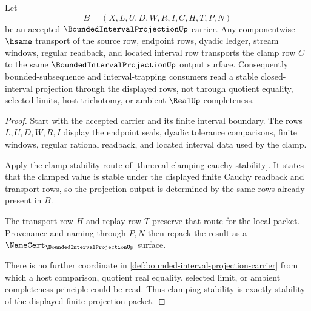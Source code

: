 \begin{theorem}
\label{thm:bounded-interval-projection-clamping-stability}
Let
$$
B=(X,L,U,D,W,R,I,C,H,T,P,N)
$$
be an accepted $\BoundedIntervalProjectionUp$ carrier. Any componentwise $\hsame$ transport of the source row, endpoint rows, dyadic ledger, stream windows, regular readback, and located interval row transports the clamp row $C$ to the same $\BoundedIntervalProjectionUp$ output surface. Consequently bounded-subsequence and interval-trapping consumers read a stable closed-interval projection through the displayed rows, not through quotient equality, selected limits, host trichotomy, or ambient $\RealUp$ completeness.
\end{theorem}
\begin{proof}
Start with the accepted carrier and its finite interval boundary. The rows $L,U,D,W,R,I$ display the endpoint seals, dyadic tolerance comparisons, finite windows, regular rational readback, and located interval data used by the clamp.

Apply the clamp stability route of \autoref{thm:real-clamping-cauchy-stability}. It states that the clamped value is stable under the displayed finite Cauchy readback and transport rows, so the projection output is determined by the same rows already present in $B$.

The transport row $H$ and replay row $T$ preserve that route for the local packet. Provenance and naming through $P,N$ then repack the result as a $\NameCert_{\BoundedIntervalProjectionUp}$ surface.

There is no further coordinate in \autoref{def:bounded-interval-projection-carrier} from which a host comparison, quotient real equality, selected limit, or ambient completeness principle could be read. Thus clamping stability is exactly stability of the displayed finite projection packet.
\end{proof}


